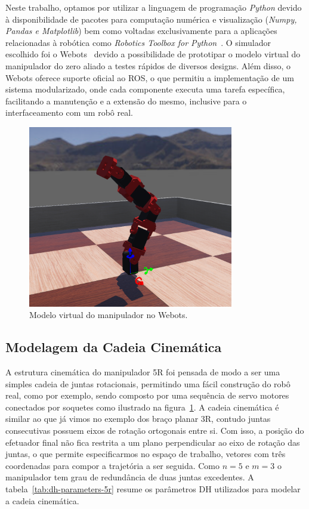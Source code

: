 Neste trabalho, optamos por utilizar a linguagem de programação \emph{Python}
devido à disponibilidade de pacotes para computação numérica e visualização
(\emph{Numpy, Pandas e Matplotlib}) bem como voltadas exclusivamente para a
aplicações relacionadas à robótica como \emph{Robotics Toolbox for
    Python}~\cite{rtb}. O simulador escolhido foi o Webots~\cite{webots} devido a
possibilidade de prototipar o modelo virtual do manipulador do zero aliado a
testes rápidos de diversos designs. Além disso, o Webots oferece suporte
oficial ao ROS, o que permitiu a implementação de um sistema modularizado, onde
cada componente executa uma tarefa específica, facilitando a manutenção e a
extensão do mesmo, inclusive para o interfaceamento com um robô real.

\begin{figure}
    \centering
    \includegraphics[width=0.8\textwidth]{./Images/webots-robot.png}
    \caption{Modelo virtual do manipulador no Webots.}\label{fig:robot-model}
\end{figure}

\subsection*{Modelagem da Cadeia Cinemática}

A estrutura cinemática do manipulador 5R foi pensada de modo a ser uma simples
cadeia de juntas rotacionais, permitindo uma fácil construção do robô real,
como por exemplo, sendo composto por uma sequência de servo motores conectados
por soquetes como ilustrado na figura~\ref{fig:robot-model}. A cadeia
cinemática é similar ao que já vimos no exemplo dos braço planar 3R, contudo
juntas consecutivas possuem eixos de rotação ortogonais entre si. Com isso, a
posição do efetuador final não fica restrita a um plano perpendicular ao eixo
de rotação das juntas, o que permite especificarmos no espaço de trabalho,
vetores com três coordenadas para compor a trajetória a ser seguida. Como \(n =
5 \text{ e } m = 3\) o manipulador tem grau de redundância de duas juntas
excedentes. A tabela~\ref{tab:dh-parameters-5r} resume os parâmetros DH
utilizados para modelar a cadeia cinemática.

